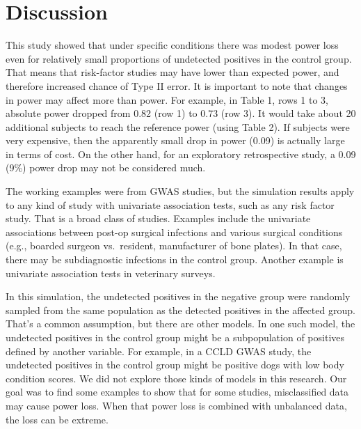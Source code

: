 \documentclass[
]{article}
\begin{document}
\hypertarget{discussion}{%
\section{Discussion}\label{discussion}}

This study showed that under specific conditions there was modest power
loss even for relatively small proportions of undetected positives in
the control group. That means that risk-factor studies may have lower
than expected power, and therefore increased chance of Type II error. It
is important to note that changes in power may affect more than power.
For example, in Table 1, rows 1 to 3, absolute power dropped from 0.82
(row 1) to 0.73 (row 3). It would take about 20 additional subjects to
reach the reference power (using Table 2). If subjects were very
expensive, then the apparently small drop in power (0.09) is actually
large in terms of cost. On the other hand, for an exploratory
retrospective study, a 0.09 (9\%) power drop may not be considered much.

The working examples were from GWAS studies, but the simulation results
apply to any kind of study with univariate association tests, such as
any risk factor study. That is a broad class of studies. Examples
include the univariate associations between post-op surgical infections
and various surgical conditions (e.g., boarded surgeon vs.~resident,
manufacturer of bone plates). In that case, there may be subdiagnostic
infections in the control group. Another example is univariate
association tests in veterinary surveys.

In this simulation, the undetected positives in the negative group were
randomly sampled from the same population as the detected positives in
the affected group. That's a common assumption, but there are other
models. In one such model, the undetected positives in the control group
might be a subpopulation of positives defined by another variable. For
example, in a CCLD GWAS study, the undetected positives in the control
group might be positive dogs with low body condition scores. We did not
explore those kinds of models in this research. Our goal was to find
some examples to show that for some studies, misclassified data may
cause power loss. When that power loss is combined with unbalanced data,
the loss can be extreme.

\newpage




\end{document}
